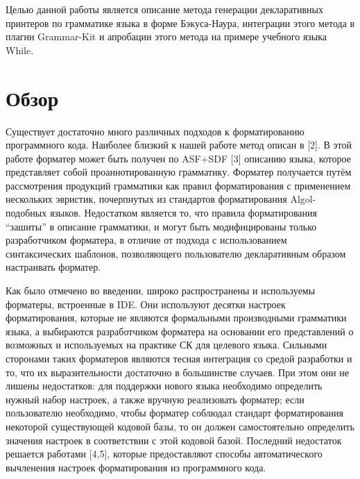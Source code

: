 \documentclass[conference]{IEEEtran}
\begin{document}
Целью данной работы является описание метода генерации декларативных
принтеров по грамматике языка в форме Бэкуса-Наура, интеграции этого метода
в плагин Grammar-Kit и апробации этого метода на примере учебного языка
While.

\section{Обзор}
Существует достаточно много различных подходов к форматированию
программного кода.
Наиболее близкий к нашей работе метод описан в [2].
В этой работе форматер может быть получен по ASF+SDF [3]
описанию языка, которое представляет собой проаннотированную грамматику.
Форматер получается путём 
рассмотрения продукций грамматики как правил форматирования
с применением нескольких эвристик,
почерпнутых из стандартов форматирования Algol-подобных языков.
Недостатком является то, что правила форматирования ``зашиты'' в
описание грамматики, и могут быть модифицированы только разработчиком
форматера,
в отличие от подхода с использованием синтаксических шаблонов,
позволяющего пользователю декларативным образом настраивать форматер.

Как было отмечено во введении, широко распространены и используемы
форматеры, встроенные в IDE.
Они используют десятки настроек форматирования,
которые не являются формальными производными грамматики языка,
а выбираются разработчиком форматера на основании его представлений
о возможных и используемых на практике СК для целевого языка.
Сильными сторонами таких форматеров являются тесная интеграция
со средой разработки и то, что их выразительности достаточно в
большинстве случаев.
При этом они не лишены недостатков:
для поддержки нового языка
необходимо определить нужный набор настроек, а также вручную реализовать
форматер;
если пользователю необходимо, чтобы форматер соблюдал стандарт
форматирования некоторой существующей кодовой базы, то он должен
самостоятельно определить значения настроек
в соответствии с этой кодовой базой.
Последний недостаток решается
работами [4,5], %
которые предоставляют
способы автоматического вычленения настроек форматирования из программного
кода.
\end{document}
